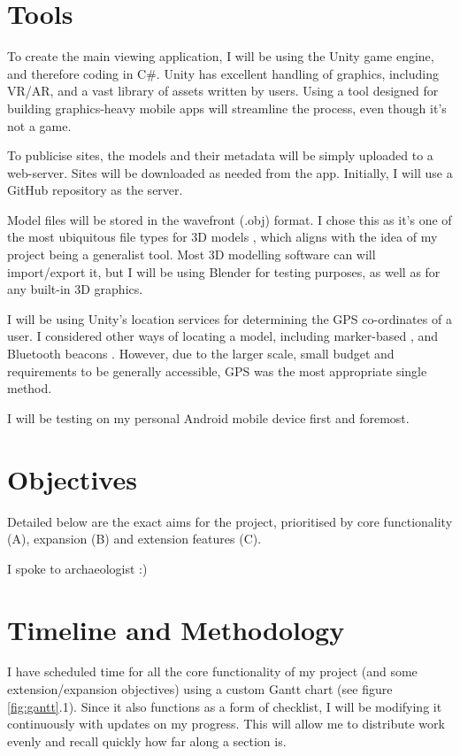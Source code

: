 \documentclass{article}
\begin{document}
\section{Tools}
To create the main viewing application, I will be using the Unity game engine, and therefore coding in C\#. Unity has excellent handling of graphics, including VR/AR, and a vast library of assets written by users. Using a tool designed for building graphics-heavy mobile apps will streamline the process, even though it's not a game. 

To publicise sites, the models and their metadata will be simply uploaded to a web-server. Sites will be downloaded as needed from the app. Initially, I will use a GitHub repository as the server.

Model files will be stored in the wavefront (.obj) format. I chose this as it's one of the most ubiquitous file types for 3D models \cite{obj1} \cite{obj2}, which aligns with the idea of my project being a generalist tool. Most 3D modelling software can will import/export it, but I will be using Blender for testing purposes, as well as for any built-in 3D graphics. 

I will be using Unity's location services for determining the GPS co-ordinates of a user. I considered other ways of locating a model, including marker-based \cite{anchor}, and Bluetooth beacons \cite{beacons}. However, due to the larger scale, small budget and requirements to be generally accessible, GPS was the most appropriate single method. 

I will be testing on my personal Android mobile device first and foremost. 

\section{Objectives}
Detailed below are the exact aims for the project, prioritised by core functionality (A), expansion (B) and extension features (C).

I spoke to archaeologist :)

\section{Timeline and Methodology}
I have scheduled time for all the core functionality of my project (and some extension/expansion objectives) using a custom Gantt chart (see figure \ref{fig:gantt}.1). Since it also functions as a form of checklist, I will be modifying it continuously with updates on my progress. This will allow me to distribute work evenly and recall quickly how far along a section is.
\end{document}
